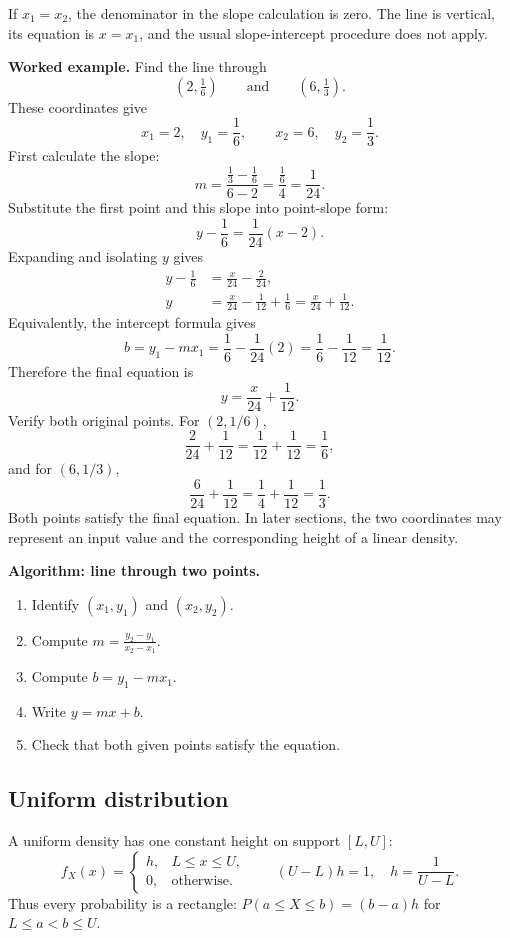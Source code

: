 If $x_1=x_2$, the denominator in the slope calculation is zero.  The line is
vertical, its equation is $x=x_1$, and the usual slope-intercept procedure does
not apply.

\textbf{Worked example.} Find the line through
\[
 (2,\tfrac16)\qquad\text{and}\qquad(6,\tfrac13).
\]
These coordinates give
\[
 x_1=2,\quad y_1=\frac16,\qquad
 x_2=6,\quad y_2=\frac13.
\]
First calculate the slope:
\[
 m=\frac{\frac13-\frac16}{6-2}
   =\frac{\frac16}{4}=\frac1{24}.
\]
Substitute the first point and this slope into point-slope form:
\[
 y-\frac16=\frac1{24}(x-2).
\]
Expanding and isolating $y$ gives
\[
 \begin{aligned}
 y-\frac16&=\frac{x}{24}-\frac2{24},\\
 y&=\frac{x}{24}-\frac1{12}+\frac16
   =\frac{x}{24}+\frac1{12}.
 \end{aligned}
\]
Equivalently, the intercept formula gives
\[
 b=y_1-mx_1=\frac16-\frac1{24}(2)
  =\frac16-\frac1{12}=\frac1{12}.
\]
Therefore the final equation is
\[
 \boxed{y=\frac{x}{24}+\frac1{12}}.
\]
Verify both original points.  For $(2,1/6)$,
\[
 \frac2{24}+\frac1{12}=\frac1{12}+\frac1{12}=\frac16,
\]
and for $(6,1/3)$,
\[
 \frac6{24}+\frac1{12}=\frac14+\frac1{12}=\frac13.
\]
Both points satisfy the final equation.  In later sections, the two coordinates
may represent an input value and the corresponding height of a linear density.

\textbf{Algorithm: line through two points.}
\begin{enumerate}
 \item Identify $(x_1,y_1)$ and $(x_2,y_2)$.
 \item Compute $\displaystyle m=\frac{y_2-y_1}{x_2-x_1}$.
 \item Compute $\displaystyle b=y_1-mx_1$.
 \item Write $\displaystyle y=mx+b$.
 \item Check that both given points satisfy the equation.
\end{enumerate}

\subsection{Uniform distribution}\label{sec:c2-intro-uniform}
A uniform density has one constant height on support $[L,U]$:
\[
 f_X(x)=\begin{cases}h,&L\le x\le U,\\0,&\text{otherwise.}\end{cases}
 \qquad (U-L)h=1,\quad h=\frac1{U-L}.
\]
Thus every probability is a rectangle: $P(a\le X\le b)=(b-a)h$ for
$L\le a<b\le U$.

